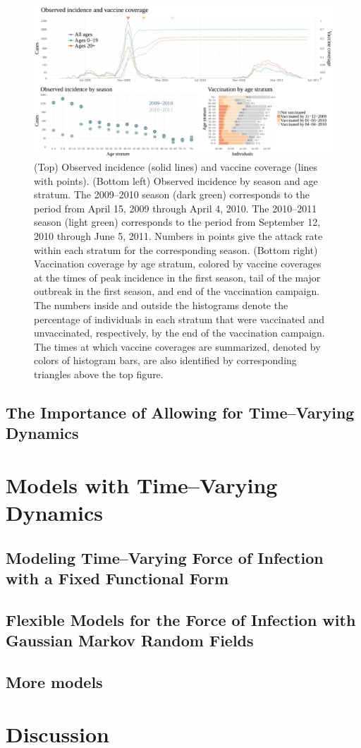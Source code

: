 \begin{figure}
	\centering
	\includegraphics[width=\linewidth]{figures/fludat_plots}
	\caption{(Top) Observed incidence (solid lines) and vaccine coverage (lines with points). (Bottom left) Observed incidence by season and age stratum. The 2009--2010 season (dark green) corresponds to the period from April 15, 2009 through April 4, 2010. The 2010--2011 season (light green) corresponds to the period from September 12, 2010 through June 5, 2011. Numbers in points give the attack rate within each stratum for the corresponding season. (Bottom right) Vaccination coverage by age stratum, colored by vaccine coverages at the times of peak incidence in the first season, tail of the major outbreak in the first season, and end of the vaccination campaign. The numbers inside and outside the histograms denote the percentage of individuals in each stratum that were vaccinated and unvaccinated, respectively, by the end of the vaccination campaign. The times at which vaccine coverages are summarized, denoted by colors of histogram bars, are also identified by corresponding triangles above the top figure.}
	\label{fig:finland_fludat}
\end{figure}


\subsection{The Importance of Allowing for Time--Varying Dynamics}
\label{subsec:tparam_motivation}




\section{Models with Time--Varying Dynamics}
\label{sec:flu_tparam_models}

\subsection{Modeling Time--Varying Force of Infection with a Fixed Functional Form}
\label{subsec:flu_quadfoi}

\subsection{Flexible Models for the Force of Infection with Gaussian Markov Random Fields}
\label{subsec:flu_gmrf}

\subsection{More models}

\section{Discussion}